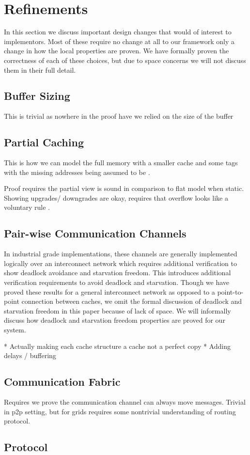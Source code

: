 \section{Refinements}

In this section we discuss important design changes that would of
interest to implementors. Most of these require no change at all to
our framework only a change in how the local properties are proven.
We have formally proven the correctness of each of these choices, but
due to space concerns we will not discuss them in their full detail. 

\subsection{Buffer Sizing}

This is trivial as nowhere in the proof have we relied on the size of the buffer

\subsection{Partial Caching}

This is how we can model the full memory with a smaller cache and some tags with the missing addresses being assumed to be \In. 

Proof requires the partial view is sound in comparison to flat model
when static. Showing upgrades/ downgrades are okay, requires that
overflow looks like a voluntary rule .

\subsection{Pair-wise Communication Channels}

In industrial grade implementations, these channels are generally
implemented logically over an interconnect network which requires
additional verification to show deadlock avoidance and starvation
freedom.  This introduces additional verification requirements to
avoid deadlock and starvation. Though we have proved these results for
a general interconnect network as opposed to a point-to-point
connection between caches, we omit the formal discussion of deadlock
and starvation freedom in this paper because of lack of space. We will
informally discuss how deadlock and starvation freedom properties are
proved for our system.

* Actually making each cache structure a cache not a perfect copy
* Adding delays / buffering

\subsection{Communication Fabric}

Requires we prove the communication channel can always move
messages. Trivial in p2p setting, but for grids requires some
nontrivial understanding of routing protocol.

\subsection{Protocol}

